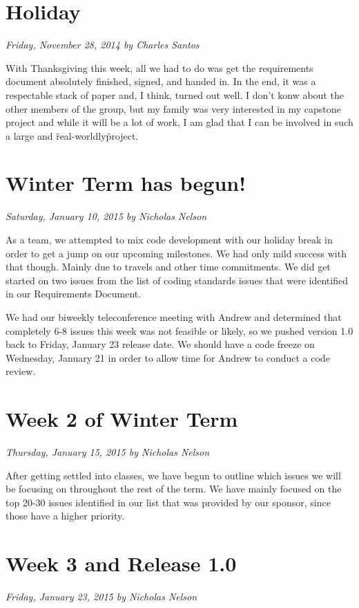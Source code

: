 \documentclass[11pt]{scrreprt}
\begin{document}
\section{Holiday}
\textit{Friday, November 28, 2014 by Charles Santos}
\newline

With Thanksgiving this week, all we had to do was get the requirements document absolutely finished, signed, and handed in. In the end, it was a respectable stack of paper and, I think, turned out well.
I don't konw about the other members of the group, but my family was very interested in my capstone project and while it will be a lot of work, I am glad that I can be involved in such a large and \"real-worldly\" project.

\section{Winter Term has begun!}
\textit{Saturday, January 10, 2015 by Nicholas Nelson}
\newline

As a team, we attempted to mix code development with our holiday break in order to get a jump on our upcoming milestones. We had only mild success with that though. Mainly due to travels and other time commitments. We did get started on two issues from the list of coding standards issues that were identified in our Requirements Document.

We had our biweekly teleconference meeting with Andrew and determined that completely 6-8 issues this week was not feasible or likely, so we pushed version 1.0 back to Friday, January 23 release date. We should have a code freeze on Wednesday, January 21 in order to allow time for Andrew to conduct a code review.

\section{Week 2 of Winter Term}
\textit{Thursday, January 15, 2015 by Nicholas Nelson}
\newline

After getting settled into classes, we have begun to outline which issues we will be focusing on throughout the rest of the term. We have mainly focused on the top 20-30 issues identified in our list that was provided by our sponsor, since those have a higher priority.

\section{Week 3 and Release 1.0}
\textit{Friday, January 23, 2015 by Nicholas Nelson}
\newline
\end{document}
